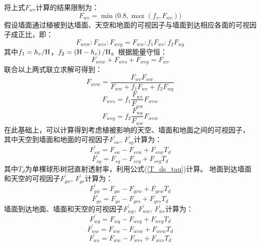 将上式$F_{wv}$计算的结果限制为：
\begin{equation}
F_{wv} = \min \big(0.8, \max (f_v, F_{wv})\big)
\end{equation}
假设墙面通过植被到达墙面、天空和地面的可视因子与墙面到达相应各面的可视因子成正比，即：
\begin{equation}
F_{wvw}: F_{wvs}: F_{wvg}=F_{ww}: f_{1} F_{ws}: f_{2} F_{w g}
\end{equation}
其中$f_1=h_v/{\rm H}$，$f_2=\left({\rm H}-h_v\right)/{\rm H}$。根据能量守恒：
\begin{equation}
F_{wvw}+F_{wvs}+F_{wvg}=F_{w v}
\end{equation}
联合以上两式联立求解可得到：
\begin{equation}
F_{wvw}=\frac{F_{w v} F_{ww}}{F_{ww}+f_{1} F_{ws}+f_{2} F_{w g}}
\end{equation}
\begin{equation}
F_{wvs}=f_{1} \frac{F_{ws}}{F_{ww}} F_{wvw}
\end{equation}
\begin{equation}
F_{wvg}=f_{2} \frac{F_{w g}}{F_{ww}} F_{wvw}
\end{equation}
在此基础上，可以计算得到考虑植被影响的天空、墙面和地面之间的可视因子，
其中天空到墙面和地面的可视因子$F_{sw}^\prime$, $F_{sg}^\prime$计算为：
\begin{equation}
F_{sw}^{\prime}=F_{sw}-F_{svw}+F_{svw} T_{d}
\end{equation}
\begin{equation}
F_{sg}^{\prime}=F_{sg}-F_{svg}+F_{svg} T_{d}
\end{equation}
其中$T_d$为单棵球形树冠直射透射率，利用公式(\ref{T_ds_tau})计算。
地面到达墙面和天空的可视因子$F_{gw}^\prime$, $F_{gs}^\prime$计算为：
\begin{equation}
F_{gw}^{\prime}=F_{gw}-F_{gvw}+F_{gvw} T_{d}
\end{equation}
\begin{equation}
F_{gs}^{\prime}=F_{gs}-F_{gvs}+F_{gvs} T_{d}
\end{equation}
墙面到达地面、墙面和天空的可视因子$F_{wg}^\prime$, $F_{ww}^\prime$, $F_{ws}^\prime$计算为：
\begin{equation}
F_{wg}^{\prime}=F_{wg}-F_{wvg}+F_{wvg} T_{d}
\end{equation}
\begin{equation}
F_{ww}^{\prime}=F_{ww}-F_{wvw}+F_{wvw} T_{d}
\end{equation}
\begin{equation}
F_{ws}^{\prime}=F_{ww}-F_{wvs}+F_{wvs} T_{d}
\end{equation}

